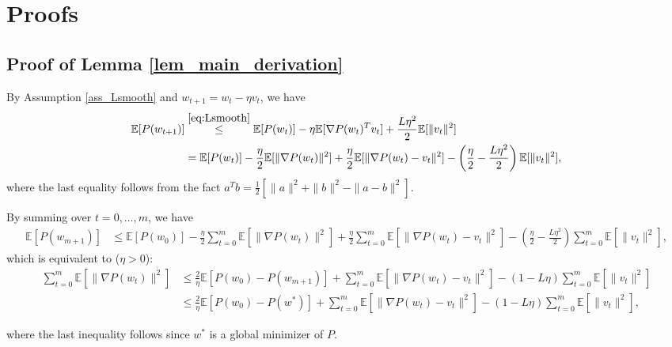 \documentclass{article}
\renewcommand{\top}{T}
\begin{document}
\section{Proofs}

\subsection{Proof of Lemma \ref{lem_main_derivation}}

By Assumption \ref{ass_Lsmooth} and $w_{t+1} = w_{t} - \eta v_{t}$, we have
\begin{align*}
\mathbb{E}[ P(w_{t+1})] & \overset{\eqref{eq:Lsmooth}}{\leq}  \mathbb{E}[ P(w_{t})] - \eta \mathbb{E}[\nabla P(w_{t})^\top v_{t}] 
+ \frac{L\eta^2}{2} \mathbb{E} [ \| v_{t} \|^2 ] 
\\%
& = \mathbb{E}[ P(w_{t})] - \frac{\eta}{2} \mathbb{E}[ \| \nabla P(w_{t})\|^2 ] 
+ \frac{\eta}{2} \mathbb{E}[ \| \nabla P(w_{t}) - v_{t} \|^2 ] 
- \left( \frac{\eta}{2} - \frac{L\eta^2}{2} \right) \mathbb{E} [ \| v_{t} \|^2 ],
\end{align*}
where the last equality follows from the fact
$a^Tb = \frac{1}{2}\left[\|a\|^2 + \|b\|^2 - \|a-b\|^2\right].$

By summing over $t = 0,\dots,m$, we have
\begin{align*}
\mathbb{E}[ P(w_{m + 1})] & \leq  \mathbb{E}[ P(w_{0})] - \frac{\eta}{2} \sum_{t=0}^{m} \mathbb{E}[ \| \nabla P(w_{t})\|^2 ] + \frac{\eta}{2} \sum_{t=0}^{m} \mathbb{E}[ \| \nabla P(w_{t}) - v_{t} \|^2 ]  
- \left( \frac{\eta}{2} - \frac{L\eta^2}{2} \right) \sum_{t=0}^{m} \mathbb{E} [ \| v_{t} \|^2 ],  
\end{align*}
which is equivalent to ($\eta>0$):
\begin{align*}
\sum_{t=0}^{m} \mathbb{E}[ \| \nabla P(w_{t})\|^2 ]  & \leq \frac{2}{\eta} \mathbb{E}[ P(w_{0}) - P(w_{m+1})] + \sum_{t=0}^{m} \mathbb{E}[ \| \nabla P(w_{t}) - v_{t} \|^2 ]  
 - ( 1 - L\eta ) \sum_{t=0}^{m} \mathbb{E} [ \| v_{t} \|^2 ] \\
& \leq \frac{2}{\eta} \mathbb{E}[ P(w_{0}) - P(w^{*})] + \sum_{t=0}^{m} \mathbb{E}[ \| \nabla P(w_{t}) - v_{t} \|^2 ]  
 - ( 1 - L\eta ) \sum_{t=0}^{m} \mathbb{E} [ \| v_{t} \|^2 ],    
\end{align*}

where the last inequality follows since $w^{*}$ is a global minimizer of $P$. 
\end{document}
